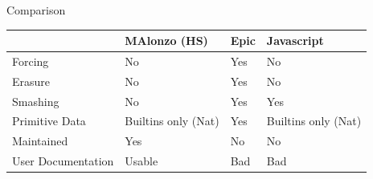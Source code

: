 \begin{frame}[fragile]{Comparison}
\begin{tabular}{l | l | l | l}
& MAlonzo (HS) & Epic & Javascript \\
\hline
Forcing & No & Yes & No \\
Erasure & No & Yes & No \\
Smashing & No & Yes & Yes \\
Primitive Data & Builtins only (Nat) & Yes & Builtins only (Nat) \\
\hline
Maintained & Yes & No & No \\
User Documentation & Usable & Bad & Bad \\
\hline
\end{tabular}
\end{frame}
